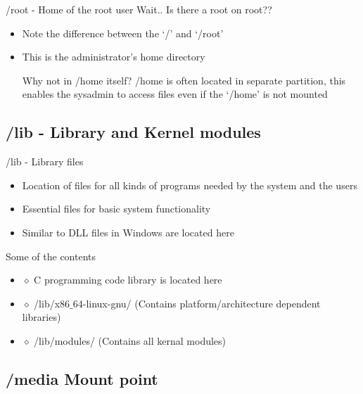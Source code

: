 \documentclass{beamer}
\begin{document}
\begin{frame}{/root - Home of the root user}
Wait.. Is there a root on root?? 

\begin{itemize}
 \setlength\itemsep{0.8em}
 \item Note the difference between the `/' and `/root'
\item This is the administrator's home directory 
\pause
\vspace{0.3cm}
\begin{block}{Why not in /home itself?}
/home is often located in separate partition, this enables the sysadmin to access files even if the `/home' is not mounted
\end{block}
\end{itemize}
\end{frame}

\subsection{/lib - Library and Kernel modules}

\begin{frame}{/lib - Library files}
\begin{itemize}
\setlength\itemsep{0.8em}
\item Location of files for all kinds of programs needed by the system and the users
\item Essential files for basic system functionality
\pause
\item Similar to DLL files in Windows are located here
\end{itemize}

\begin{block}{Some of the contents}
\begin{itemize}
\item[] $\diamond$ C programming code library is located here
\item[] $\diamond$ /lib/x8$6\_6$4-linux-gnu/ (Contains platform/architecture dependent libraries)
\item[] $\diamond$ /lib/modules/ (Contains all kernal modules)
\end{itemize}
\end{block}

\end{frame}


\subsection{/media Mount point}
\end{document}
